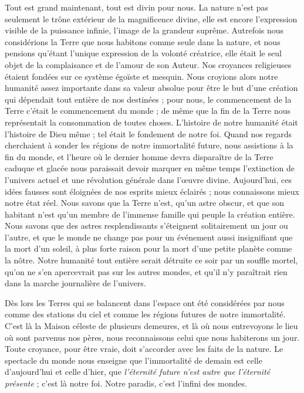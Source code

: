 \documentclass[a4paper, 11pt, oneside, landscape]{article}
\begin{document}
Tout est grand maintenant, tout est divin pour nous. La nature n'est pas seulement le trône extérieur de la magnificence divine, elle est encore l'expression visible de la puissance infinie, l'image de la grandeur suprême. Autrefois nous considérions la Terre que nous habitons comme seule dans la nature, et nous pensions qu'étant l'unique expression de la volonté créatrice, elle était le seul objet de la complaisance et de l'amour de son Auteur. Nos croyances religieuses étaient fondées sur ce système égoïste et mesquin. Nous croyions alors notre humanité assez importante dans sa valeur absolue pour être le but d'une création qui dépendait tout entière de nos destinées ; pour nous, le commencement de la Terre c'était le commencement du monde ; de même que la fin de la Terre nous représentait la consommation de toutes choses. L'histoire de notre humanité était l'histoire de Dieu même ; tel était le fondement de notre foi. Quand nos regards cherchaient à sonder les régions de notre immortalité future, nous assistions à la fin du monde, et l'heure où le dernier homme devra disparaître de la Terre caduque et glacée nous paraissait devoir marquer en même temps l'extinction de l'univers actuel et une révolution générale dans l'œuvre divine. Aujourd'hui, ces idées fausses sont éloignées de nos esprits mieux éclairés ; nous connaissons mieux notre état réel. Nous savons que la Terre n'est, qu'un astre obscur, et que son habitant n'est qu'un membre de l'immense famille qui peuple la création entière. Nous savons que des astres resplendissants s'éteignent solitairement un jour ou l'autre, et que le monde ne change pas pour un événement aussi insignifiant que la mort d'un soleil, à plus forte raison pour la mort d'une petite planète comme la nôtre. Notre humanité tout entière serait détruite ce soir par un souffle mortel, qu'on ne s'en apercevrait pas sur les autres mondes, et qu'il n'y paraîtrait rien dans la marche journalière de l'univers.

Dès lors les Terres qui se balancent dans l'espace ont été considérées par nous comme des stations du ciel et comme les régions futures de notre immortalité. C'est là la Maison céleste de plusieurs demeures, et là où nous entrevoyons le lieu où sont parvenus nos pères, nous reconnaissons celui que nous habiterons un jour. Toute croyance, pour être vraie, doit s'accorder avec les faits de la nature. Le spectacle du monde nous enseigne que l'immortalité de demain est celle d'aujourd'hui et celle d'hier, que \emph{l'éternité future n'est autre que l'éternité présente} ; c'est là notre foi. Notre paradis, c'est l'infini des mondes.
\end{document}
